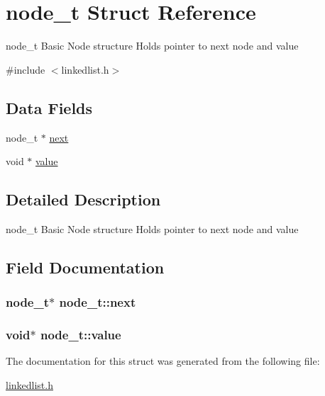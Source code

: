 \hypertarget{structnode}{}\section{node\+\_\+t Struct Reference}
\label{structnode}


node\+\_\+t Basic Node structure Holds pointer to next node and value  




{\ttfamily \#include $<$linkedlist.\+h$>$}

\subsection*{Data Fields}
\begin{DoxyCompactItemize}
\item 
node\+\_\+t $\ast$ \hyperlink{structnode_a3eaaa938f4adef906b28c0afcaf511d6}{next}
\item 
void $\ast$ \hyperlink{structnode_aaf8a798f9224379b485c34f7e0fab66b}{value}
\end{DoxyCompactItemize}


\subsection{Detailed Description}
node\+\_\+t Basic Node structure Holds pointer to next node and value 

\subsection{Field Documentation}
\hypertarget{structnode_a3eaaa938f4adef906b28c0afcaf511d6}{}
\subsubsection[{next}]{\setlength{\rightskip}{0pt plus 5cm}node\+\_\+t$\ast$ node\+\_\+t\+::next}\label{structnode_a3eaaa938f4adef906b28c0afcaf511d6}
\hypertarget{structnode_aaf8a798f9224379b485c34f7e0fab66b}{}
\subsubsection[{value}]{\setlength{\rightskip}{0pt plus 5cm}void$\ast$ node\+\_\+t\+::value}\label{structnode_aaf8a798f9224379b485c34f7e0fab66b}


The documentation for this struct was generated from the following file\+:\begin{DoxyCompactItemize}
\item 
\hyperlink{linkedlist_8h}{linkedlist.\+h}\end{DoxyCompactItemize}
